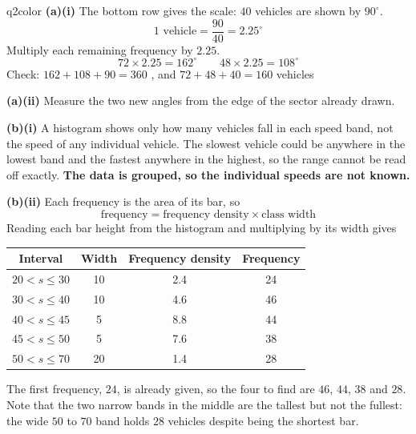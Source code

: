 \documentclass[11pt,a4paper]{article}
\begin{document}
\begin{ansbox}{q2color}
\textbf{(a)(i)} The bottom row gives the scale: $40$ vehicles are shown by $90^{\circ}$.
\[ 1 \text{ vehicle} = \frac{90}{40} = 2.25^{\circ} \]
Multiply each remaining frequency by $2.25$.
\[ 72 \times 2.25 = 162^{\circ} \qquad 48 \times 2.25 = 108^{\circ} \]
Check: $162 + 108 + 90 = 360$ \checkmark, and $72 + 48 + 40 = 160$ vehicles \checkmark

\textbf{(a)(ii)} Measure the two new angles from the edge of the sector already drawn.

\begin{center}
\end{center}

\textbf{(b)(i)} A histogram shows only how many vehicles fall in each speed band, not the speed of any individual vehicle. The slowest vehicle could be anywhere in the lowest band and the fastest anywhere in the highest, so the range cannot be read off exactly. \textbf{The data is grouped, so the individual speeds are not known.}

\textbf{(b)(ii)} Each frequency is the area of its bar, so
\[ \text{frequency} = \text{frequency density} \times \text{class width} \]
Reading each bar height from the histogram and multiplying by its width gives
\begin{center}
\begin{tabular}{|c|c|c|c|}
\hline
Interval & Width & Frequency density & Frequency \\ \hline
$20 < s \leqslant 30$ & 10 & 2.4 & 24 \\ \hline
$30 < s \leqslant 40$ & 10 & 4.6 & 46 \\ \hline
$40 < s \leqslant 45$ & 5 & 8.8 & 44 \\ \hline
$45 < s \leqslant 50$ & 5 & 7.6 & 38 \\ \hline
$50 < s \leqslant 70$ & 20 & 1.4 & 28 \\ \hline
\end{tabular}
\end{center}
The first frequency, $24$, is already given, so the four to find are $46$, $44$, $38$ and $28$. Note that the two narrow bands in the middle are the tallest but not the fullest: the wide $50$ to $70$ band holds $28$ vehicles despite being the shortest bar.
\end{ansbox}
\end{document}
